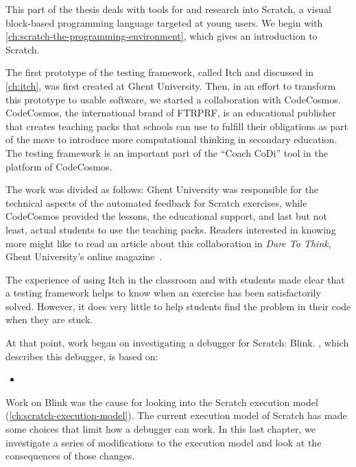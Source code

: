 \documentclass[./main]{subfiles}
\begin{document}
\label{ch:preface-2}

This part of the thesis deals with tools for and research into Scratch, a visual block-based programming language targeted at young users.
We begin with \cref{ch:scratch-the-programming-environment}, which gives an introduction to Scratch.

The first prototype of the testing framework, called Itch and discussed in \cref{ch:itch}, was first created at Ghent University.
Then, in an effort to transform this prototype to usable software, we started a collaboration with CodeCosmos.
CodeCosmos, the international brand of FTRPRF, is an educational publisher that creates teaching packs that schools can use to fulfill their obligations as part of the move to introduce more computational thinking in secondary education.
The testing framework is an important part of the ``Coach CoDi'' tool in the platform of CodeCosmos.

The work was divided as follows: Ghent University was responsible for the technical aspects of the automated feedback for Scratch exercises, while CodeCosmos provided the lessons, the educational support, and last but not least, actual students to use the teaching packs.
Readers interested in knowing more might like to read an article about this collaboration in \textit{Dare To Think}, Ghent University's online magazine~\autocite{daretothinkCoachCoDiMotivationboosting2023}.

The experience of using Itch in the classroom and with students made clear that a testing framework helps to know when an exercise has been satisfactorily solved.
However, it does very little to help students find the problem in their code when they are stuck.

At that point, work began on investigating a debugger for Scratch: Blink.
, which describes this debugger, is based on:

\begin{itemize}
    \item {}
\end{itemize}

Work on Blink was the cause for looking into the Scratch execution model (\cref{ch:scratch-execution-model}).
The current execution model of Scratch has made some choices that limit how a debugger can work.
In this last chapter, we investigate a series of modifications to the execution model and look at the consequences of those changes.
\end{document}
